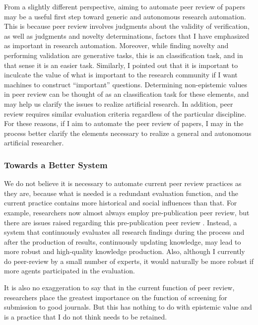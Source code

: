 \documentclass{book}
\begin{document}
From a slightly different perspective, aiming to automate peer review of papers may be a useful first step toward generic and autonomous research automation. This is because peer review involves judgments about the validity of verification, as well as judgments and novelty determinations, factors that I have emphasized as important in research automation. Moreover, while finding novelty and performing validation are generative tasks, this is an classification task, and in that sense it is an easier task. Similarly, I pointed out that it is important to inculcate the value of what is important to the research community if I want machines to construct ``important'' questions. Determining non-epistemic values in peer review can be thought of as an classification task for these elements, and may help us clarify the issues to realize artificial research. In addition, peer review requires similar evaluation criteria regardless of the particular discipline. For these reasons, if I aim to automate the peer review of papers, I may in the process better clarify the elements necessary to realize a general and autonomous artificial researcher.

\subsubsection{Towards a Better System}
We do not believe it is necessary to automate current peer review practices as they are, because what is needed is a redundant evaluation function, and the current practice contains more historical and social influences than that. For example, researchers now almost always employ pre-publication peer review, but there are issues raised regarding this pre-publication peer review \cite{heesen2021peer}. Instead, a system that continuously evaluates all research findings during the process and after the production of results, continuously updating knowledge, may lead to more robust and high-quality knowledge production. Also, although I currently do peer-review by a small number of experts, it would naturally be more robust if more agents participated in the evaluation.

It is also no exaggeration to say that in the current function of peer review, researchers place the greatest importance on the function of screening for submission to good journals. But this has nothing to do with epistemic value and is a practice that I do not think needs to be retained.
\end{document}
